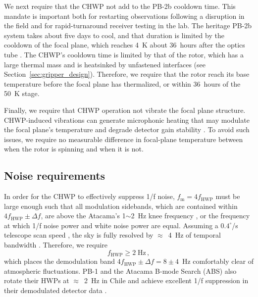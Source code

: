 We next require that the CHWP not add to the PB-2b cooldown time. This mandate is important both for restarting observations following a disruption in the field and for rapid-turnaround receiver testing in the lab. The heritage PB-2b system takes about five days to cool, and that duration is limited by the cooldown of the focal plane, which reaches 4~K about 36~hours after the optics tube \cite{howe_polarbear-2_2019}. The CHWP's cooldown time is limited by that of the rotor, which has a large thermal mass and is heatsinked by unfastened interfaces (see Section~\ref{sec:gripper_design}). Therefore, we require that the rotor reach its base temperature before the focal plane has thermalized, or within 36~hours of the 50~K stage.

Finally, we require that CHWP operation not vibrate the focal plane structure. CHWP-induced vibrations can generate microphonic heating that may modulate the focal plane's temperature and degrade detector gain stability \cite{howe_polarbear-2_2019}. To avoid such issues, we require no measurable difference in focal-plane temperature between when the rotor is spinning and when it is not.


\subsection{Noise requirements}
\label{sec:noise_requirements}

In order for the CHWP to effectively suppress 1/f noise, $f_{\mathrm{m}} = 4 f_{\mathrm{HWP}}$ must be large enough such that all modulation sidebands, which are contained within $4 f_{\mathrm{HWP}} \pm \Delta f$, are above the Atacama's 1$\sim$2~Hz knee frequency \cite{takakura_performance_2017,kusaka_modulation_2014}, or the frequency at which 1/f noise power and white noise power are equal. Assuming a $0.4^{\circ}$/s telescope scan speed \cite{the_polarbear_collaboration_measurement_2020}, the sky is fully resolved by $\approx$~4~Hz of temporal bandwidth \cite{takakura_performance_2017}. Therefore, we require
\begin{equation}
    f_{\mathrm{HWP}} \geq 2 \; \mathrm{Hz}
    \label{eq:rot_freq_requirement} \, ,
\end{equation}
\noindent
which places the demodulation band $4f_{\mathrm{HWP}} \pm \Delta f = 8 \pm 4$~Hz comfortably clear of atmospheric fluctuations. PB-1 and the Atacama B-mode Search (ABS) also rotate their HWPs at $\approx$~2~Hz in Chile and achieve excellent 1/f suppression in their demodulated detector data \cite{takakura_performance_2017,kusaka_modulation_2014}.

